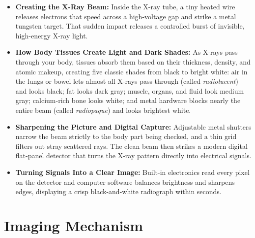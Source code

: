 \begin{itemize}
    \item \textbf{Creating the X-Ray Beam:} Inside the X-ray tube, a tiny heated wire releases electrons that speed across a high-voltage gap and strike a metal tungsten target. That sudden impact releases a controlled burst of invisible, high-energy X-ray light.
    \item \textbf{How Body Tissues Create Light and Dark Shades:} As X-rays pass through your body, tissues absorb them based on their thickness, density, and atomic makeup, creating five classic shades from black to bright white: air in the lungs or bowel lets almost all X-rays pass through (called \textit{radiolucent}) and looks black; fat looks dark gray; muscle, organs, and fluid look medium gray; calcium-rich bone looks white; and metal hardware blocks nearly the entire beam (called \textit{radiopaque}) and looks brightest white.
    \item \textbf{Sharpening the Picture and Digital Capture:} Adjustable metal shutters narrow the beam strictly to the body part being checked, and a thin grid filters out stray scattered rays. The clean beam then strikes a modern digital flat-panel detector that turns the X-ray pattern directly into electrical signals.
    \item \textbf{Turning Signals Into a Clear Image:} Built-in electronics read every pixel on the detector and computer software balances brightness and sharpens edges, displaying a crisp black-and-white radiograph within seconds.
\end{itemize}

\section{Imaging Mechanism}

